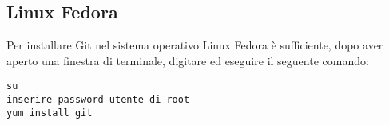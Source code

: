 \subsection{Linux Fedora}
Per installare Git nel sistema operativo Linux Fedora è sufficiente, dopo aver aperto una finestra di terminale, digitare ed eseguire il seguente comando:

\begin{center}
\texttt{su}\\
\texttt{inserire password utente di root}\\
\texttt{yum install git}
\end{center}
